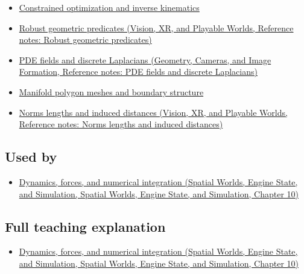 \begin{itemize}
\tightlist
\item
  \hyperref[appendix-29f4bea4c2bb]{Constrained optimization and inverse kinematics}
\item
  \href{../07-Vision-XR-and-Playable-Worlds/main.pdf\#nameddest=appendix-341296fb3f64}{Robust geometric predicates (Vision, XR, and Playable Worlds, Reference notes: Robust geometric predicates)}
\item
  \href{../03-Geometry-Cameras-and-Image-Formation/main.pdf\#nameddest=appendix-1988d465c119}{PDE fields and discrete Laplacians (Geometry, Cameras, and Image Formation, Reference notes: PDE fields and discrete Laplacians)}
\item
  \hyperref[appendix-fab348609369]{Manifold polygon meshes and boundary structure}
\item
  \href{../07-Vision-XR-and-Playable-Worlds/main.pdf\#nameddest=appendix-49933872bb51}{Norms lengths and induced distances (Vision, XR, and Playable Worlds, Reference notes: Norms lengths and induced distances)}
\end{itemize}

\subsection{Used by}\label{appendix-a9ba01fa72a6-used-by}

\begin{itemize}
\tightlist
\item
  \href{../05-Spatial-Worlds-Engine-State-and-Simulation/main.pdf\#nameddest=04-visual-computing-ii-ch029-dynamics-forces-and-numerical-integration}{Dynamics, forces, and numerical integration (Spatial Worlds, Engine State, and Simulation, Spatial Worlds, Engine State, and Simulation, Chapter 10)}
\end{itemize}

\subsection{Full teaching explanation}\label{appendix-a9ba01fa72a6-full-teaching-explanation}

\begin{itemize}
\tightlist
\item
  \href{../05-Spatial-Worlds-Engine-State-and-Simulation/main.pdf\#nameddest=04-visual-computing-ii-ch029-dynamics-forces-and-numerical-integration}{Dynamics, forces, and numerical integration (Spatial Worlds, Engine State, and Simulation, Spatial Worlds, Engine State, and Simulation, Chapter 10)}
\end{itemize}

